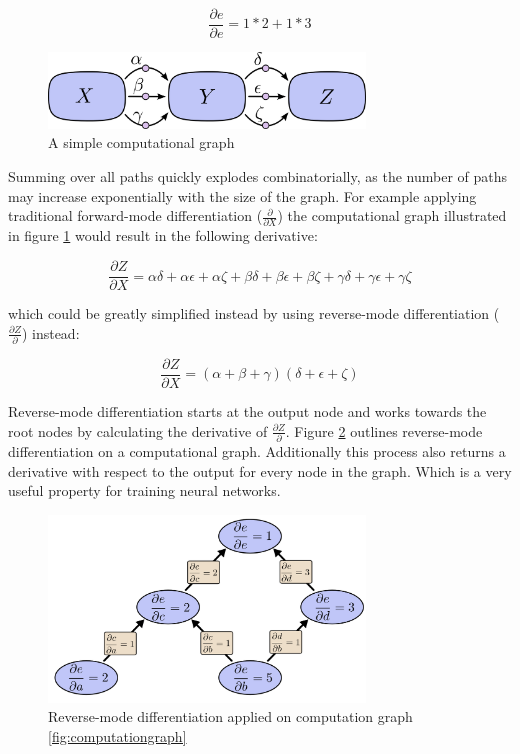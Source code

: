 \documentclass[draft,final,oneside]{vutinfth} %
\begin{document}
\begin{equation}
\frac{\partial e}{\partial e} = 1 * 2 + 1  * 3
\end{equation}

\begin{figure}[ht]
	\centering
  	\includegraphics[width=0.75\textwidth]{graphics/computationgraphsimple.png}
	\caption{A simple computational graph \cite{colahbackprop}}
	\label{fig:computationgraphsimple}
\end{figure}

Summing over all paths quickly explodes combinatorially, as the number of paths may increase exponentially with the size of the graph. For example applying traditional forward-mode differentiation ($\frac{\partial}{\partial X}$) the computational graph illustrated in figure \ref{fig:computationgraphsimple} would result in the following derivative:

\begin{equation}
\frac{\partial Z}{\partial X} = \alpha \delta + \alpha \epsilon + \alpha \zeta + \beta \delta + \beta \epsilon + \beta \zeta + \gamma \delta + \gamma \epsilon + \gamma \zeta
\end{equation}

which could be greatly simplified instead by using reverse-mode differentiation  ($\frac{\partial Z}{\partial}$) instead:

\begin{equation}
\frac{\partial Z}{\partial X} = (\alpha + \beta + \gamma)(\delta + \epsilon + \zeta)
\end{equation}

Reverse-mode differentiation starts at the output node and works towards the root nodes by calculating the derivative of $\frac{\partial Z}{\partial}$. Figure \ref{fig:computationgraphreverse} outlines reverse-mode differentiation on a computational graph. Additionally this process also returns a derivative with respect to the output for every node in the graph. Which is a very useful property for training neural networks.

\begin{figure}[ht]
	\centering
  	\includegraphics[width=0.75\textwidth]{graphics/computationgraphreverse.png}
	\caption{Reverse-mode differentiation applied on computation graph \ref{fig:computationgraph} \cite{colahbackprop}}
	\label{fig:computationgraphreverse}
\end{figure}
\end{document}
